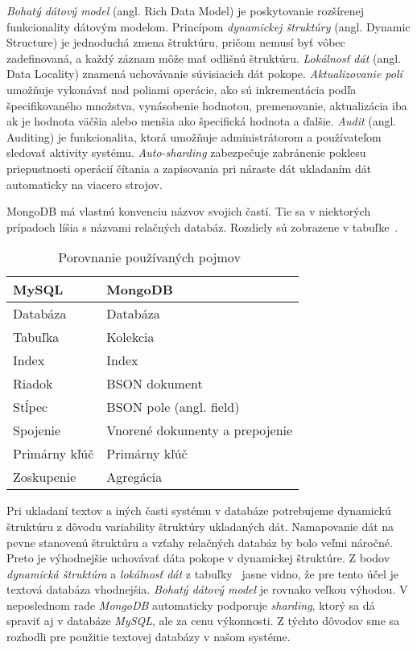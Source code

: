 \textit{Bohatý dátový model} (angl. Rich Data Model) je poskytovanie rozšírenej funkcionality dátovým modelom. Princípom \textit{dynamickej štruktúry} (angl. Dynamic Structure) je jednoduchá zmena štruktúru, pričom nemusí byť vôbec zadefinovaná, a každý záznam môže mať odlišnú štruktúru. \textit{Lokálnosť dát} (angl. Data Locality) znamená uchovávanie súvisiacich dát pokope. \textit{Aktualizovanie polí} umožňuje vykonávať nad poliami operácie, ako sú inkrementácia podľa špecifikovaného množstva, vynásobenie hodnotou, premenovanie, aktualizácia iba ak je hodnota väčšia alebo menšia ako špecifická hodnota a ďalšie. \textit{Audit} (angl. Auditing) je funkcionalita, ktorá umožňuje administrátorom a používateľom sledovať aktivity systému. \textit{Auto-sharding} zabezpečuje zabránenie poklesu priepustnosti operácií čítania a zapisovania pri náraste dát ukladaním dát automaticky na viacero strojov.

MongoDB má vlastnú konvenciu názvov svojich častí. Tie sa v niektorých prípadoch líšia s názvami relačných databáz. Rozdiely sú zobrazene v tabuľke~.

\begin{table}[H]
	\centering
	\caption{Porovnanie používaných pojmov~\cite{MongoDBvsMySQL2015}}
	\label{table:names_of_mongodb}
	\begin{tabular}{|l|l|}
		\hline
		\textbf{MySQL} & \textbf{MongoDB} \\ \hline
		Databáza & Databáza \\ \hline
		Tabuľka & Kolekcia \\ \hline
		Index & Index \\ \hline
		Riadok & BSON dokument \\ \hline
		Stĺpec & BSON pole (angl. field) \\ \hline
		Spojenie & Vnorené dokumenty a prepojenie \\ \hline
		Primárny kľúč & Primárny kľúč \\ \hline
		Zoskupenie & Agregácia \\ \hline
	\end{tabular}
\end{table}

Pri ukladaní textov a iných časti systému v databáze potrebujeme dynamickú štruktúru z dôvodu variability štruktúry ukladaných dát. Namapovanie dát na pevne stanovenú štruktúru a vzťahy relačných databáz by bolo veľmi náročné. Preto je výhodnejšie uchovávať dáta pokope v dynamickej štruktúre. Z bodov \textit{dynamická štruktúra} a \textit{lokálnosť dát} z tabuľky~ jasne vidno, že pre tento účel je textová databáza vhodnejšia. \textit{Bohatý dátový model} je rovnako veľkou výhodou. V neposlednom rade \textit{MongoDB} automaticky podporuje \textit{sharding}, ktorý sa dá spraviť aj v databáze \textit{MySQL}, ale za cenu výkonnosti. Z týchto dôvodov sme sa rozhodli pre použitie textovej databázy v našom systéme.

